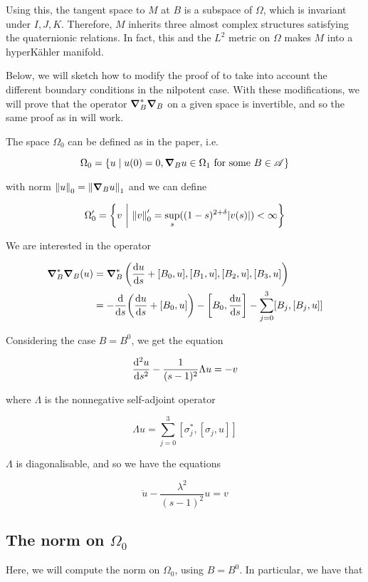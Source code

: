 \documentclass{report}
\begin{document}
Using this, the tangent space to \(M\) at \(B\) is a subspace of \(\Omega\), which is invariant under \(I, J, K\). Therefore, \(M\) inherits three almost complex structures satisfying the quaternionic relations. In fact, this and the \(L^2\) metric on \(\Omega\) makes \(M\) into a hyperK\"ahler manifold.

Below, we will sketch how to modify the proof of \cite[Lemma 3.8]{kronheimer_hyper-kahlerian_1990} to take into account the different boundary conditions in the nilpotent case. With these modifications, we will prove that the operator \(\grad_B^*\grad_B\) on a given space is invertible, and so the same proof as in \cite[Proposition 3.9]{kronheimer_hyper-kahlerian_1990} will work.

The space \(\Omega_0\) can be defined as in the paper, i.e.

\[\Omega_0 = \left\{u \mid u(0) = 0, \grad_Bu \in \Omega_1 \text{ for some }B \in \mathscr{A}\right\}\]

with norm \(\norm{u}_0 = \norm{\grad_Bu}_1\) and we can define

\[\Omega_0' = \left\{v \ \bigg\vert\  \norm{v}_0' = \sup_s((1-s)^{2+\delta}\abs{v(s)}) < \infty\right\}\]

We are interested in the operator

\begin{align*}
    \grad_B^*\grad_B(u) &= \grad_B^*\left(\dv{u}{s} + [B_0, u], [B_1, u], [B_2, u], [B_3, u]\right) \\
    &= -\dv{s}(\dv{u}{s} + [B_0, u]) - \left[B_0, \dv{u}{s}\right]- \sum_{j=0}^3[B_j, [B_j, u]]
\end{align*}

Considering the case \(B = B^0\), we get the equation

\[\dv[2]{u}{s} - \frac{1}{(s-1)^2}\Lambda u = -v\]

where \(\Lambda\) is the nonnegative self-adjoint operator

\[\Lambda u = \sum_{j=0}^3 [\sigma_j^*, [\sigma_j, u]]\]

\(\Lambda\) is diagonalisable, and so we have the equations

\[\ddot u - \frac{\lambda^2}{(s-1)^2}u = v\]

\subsection{The norm on \(\Omega_0\)}

Here, we will compute the norm on \(\Omega_0\), using \(B = B^0\). In particular, we have that
\end{document}
